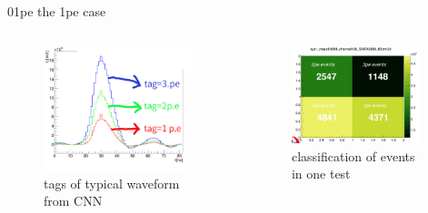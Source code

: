 \documentclass[11pt,compress,xcolor=x11names,UTF8]{beamer}
\begin{document}
\begin{frame}{01pe}
	the 1pe case
\begin{columns}
\begin{column}{.485\textwidth}
\begin{figure}
\centering
\includegraphics[width=0.94\textwidth]{figure/cnntags.png} %
\caption{tags of typical waveform from CNN}
\end{figure}
\end{column}
\begin{column}{.485\textwidth}
\begin{figure}
\centering
\includegraphics[width=0.94\textwidth]{figure/cnnres.png} %
\caption{classification of events in one test}
\end{figure}
\end{column}
\end{columns}
\end{frame}
\end{document}
